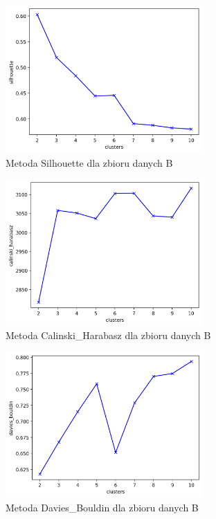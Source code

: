 \documentclass[a4paper,11pt]{article}
\begin{document}
\begin{figure}[H]
    	\centering
    	\includegraphics[width=0.67\textwidth]{images3/silhouette_Wines.png}
    	\caption{Metoda Silhouette dla zbioru danych B}
    	\label{silh_bw}
\end{figure}

\begin{figure}[H]
    	\centering
    	\includegraphics[width=0.67\textwidth]{images3/calinski_harabasz_Wines.png}
    	\caption{Metoda Calinski\_Harabasz dla zbioru danych B}
    	\label{silh_bhh}
\end{figure}

\begin{figure}[H]
    	\centering
    	\includegraphics[width=0.67\textwidth]{images3/davies_bouldin_Wines.png}
    	\caption{Metoda Davies\_Bouldin dla zbioru danych B}
    	\label{silh_bdd}
\end{figure}
\end{document}
